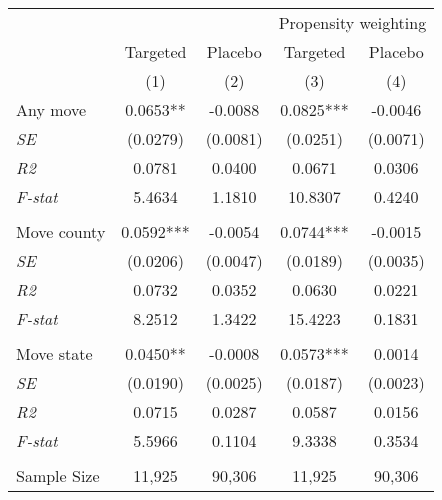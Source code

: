 \begin{tabular}{lcccc}
\toprule
\toprule
 & & & \multicolumn{2}{c}{Propensity weighting}  \\
 & Targeted & Placebo & Targeted & Placebo \\
 & (1) & (2)  & (3) & (4)  \\
\midrule 
 Any move & 0.0653** & -0.0088 & 0.0825*** & -0.0046 \\
 \textit{SE} & (0.0279) & (0.0081) & (0.0251) & (0.0071) \\
 \textit{R2} & 0.0781 & 0.0400 & 0.0671 & 0.0306  \\
 \textit{F-stat} & 5.4634 & 1.1810 & 10.8307 & 0.4240  \\
\\
 Move county & 0.0592*** & -0.0054 & 0.0744*** & -0.0015 \\
 \textit{SE} & (0.0206) & (0.0047) & (0.0189) & (0.0035) \\
 \textit{R2} & 0.0732 & 0.0352 & 0.0630 & 0.0221  \\
 \textit{F-stat} & 8.2512 & 1.3422 & 15.4223 & 0.1831  \\
\\
 Move state & 0.0450** & -0.0008 & 0.0573*** & 0.0014 \\
 \textit{SE} & (0.0190) & (0.0025) & (0.0187) & (0.0023) \\
 \textit{R2} & 0.0715 & 0.0287 & 0.0587 & 0.0156  \\
 \textit{F-stat} & 5.5966 & 0.1104 & 9.3338 & 0.3534  \\
\\
Sample Size  & 11,925  & 90,306  & 11,925  & 90,306 \\
\bottomrule
\bottomrule
\end{tabular}